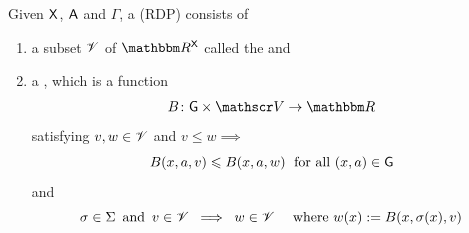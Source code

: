 \begin{frame}
    
    Given $\mathsf X$, $\mathsf A$ and $\Gamma$, a  (RDP) consists of
    
        \vspace{0.5em}
    \begin{enumerate}
        \item a subset $\mathscr V$ of $\RR^\Xsf$ called the 
             and
        \vspace{0.5em}
        \vspace{0.5em}
        \item a , which is a function
                \begin{equation*}
                    B \colon \Gsf \times \vV \to \RR
                \end{equation*}
              satisfying $v, w \in \mathscr V$ and $v \leq w \implies$
              \vspace{0.5em}
              \begin{equation*}
                B(x, a, v) \leqslant B(x, a, w) \; \text{ for all $(x, a) \in \mathsf G$}
              \end{equation*}
              and 
                \begin{equation*}
                    \sigma \in \Sigma 
                    \, \text{ and } \,
                    v \in \mathscr V
                    \; \implies \;
                    w \in \mathscr V
                    \quad \text{ where }
                    w(x) := B(x, \sigma(x), v)
                \end{equation*}
    \end{enumerate}

\end{frame}


